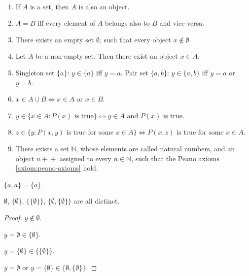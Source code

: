 \documentclass{article}
\newcommand{\pp}{\!+\!+}
\begin{document}
\begin{axiom}~
    \label{axiom:sets}
    \begin{enumerate}
        \item \label{item:sets-1} If $A$ is a set, then $A$ is also an object.
        \item \label{item:sets-2} $A=B$ iff every element of $A$ belongs also to $B$ and vice versa.
        \item \label{item:sets-3} There exists an empty set $\emptyset$, such that every object $x \notin \emptyset$.
        \item \label{item:sets-4} Let $A$ be a non-empty set. Then there exist an object $x \in A$.
        \item \label{item:sets-5} Singleton set $\{a\}$: $y \in \{a\}$ iff $y=a$.
              Pair set $\{a,b\}$: $y \in \{a,b\}$ iff $y=a$ or $y=b$.
        \item \label{item:sets-6} $x \in A \cup B \Leftrightarrow x \in A$ or $x \in B$.
        \item \label{item:sets-7} $y \in \{x \in A : P(x) \text{ is true}\} \Leftrightarrow y \in A \text{ and } P(x) \text{ is true}$.
        \item \label{item:sets-8} $z \in \{y : P(x,y) \text{ is true for some } x \in A\} \Leftrightarrow P(x,z) \text{ is true for some } x \in A$.
        \item \label{item:sets-9} There exists a set $\mathbb{N}$, whose elements are called natural numbers, and an object $n\pp$ assigned to every $n \in \mathbb{N}$, such that the Peano axioms \ref{axiom:peano-axioms} hold.
    \end{enumerate}
\end{axiom}

\begin{example}
    $\{a,a\} = \{a\}$
\end{example}

\begin{exercise}
    $\emptyset$, $\{\emptyset\}$, $\{\{\emptyset\}\}$, $\{\emptyset,\{\emptyset\}\}$ are all distinct.
\end{exercise}

\begin{proof}
    $y \notin \emptyset$.

    $y=\emptyset \in \{\emptyset\}$.

    $y=\{\emptyset\} \in \{\{\emptyset\}\}$.

    $y=\emptyset$ or $y=\{\emptyset\} \in \{\emptyset,\{\emptyset\}\}$.
\end{proof}
\end{document}
